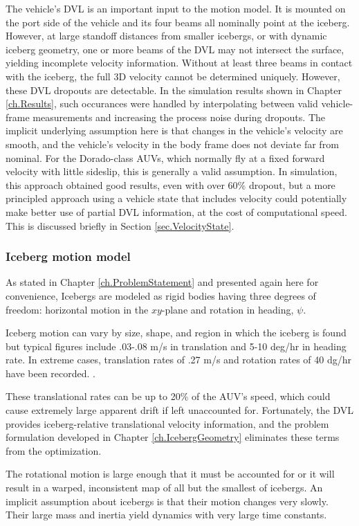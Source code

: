 The vehicle's DVL is an important input to the motion model. It is mounted on the port side of the vehicle and its four beams all nominally point at the iceberg. However, at large standoff distances from smaller icebergs, or with dynamic iceberg geometry, one or more beams of the DVL may not intersect the surface, yielding incomplete velocity information. Without at least three beams in contact with the iceberg, the full 3D velocity cannot be determined uniquely. However, these DVL dropouts are detectable. In the simulation results shown in Chapter \ref{ch.Results}, such occurances were handled by interpolating between valid vehicle-frame measurements and increasing the process noise during dropouts. The implicit underlying assumption here is that changes in the vehicle's velocity are smooth, and the vehicle's velocity in the body frame does not deviate far from nominal. For the Dorado-class AUVs, which normally fly at a fixed forward velocity with little sideslip, this is generally a valid assumption. In simulation, this approach obtained good results, even with over 60\% dropout, but a more principled approach using a vehicle state that includes velocity could potentially make better use of partial DVL information, at the cost of computational speed. This is discussed briefly in Section \ref{sec.VelocityState}.


\subsubsection{Iceberg motion model}

As stated in Chapter \ref{ch.ProblemStatement} and presented again here for convenience, Icebergs are modeled as rigid bodies having three degrees of freedom: horizontal motion in the $xy$-plane and rotation in heading, $\psi$. 

Iceberg motion can vary by size, shape, and region in which the iceberg is found but typical figures include .03-.08 m/s in translation  and 5-10 deg/hr in heading rate. In extreme cases, translation rates of .27 m/s and rotation rates of 40 dg/hr have been recorded. \cite{?} \cite{?}. 

These translational rates can be up to 20\% of the AUV's speed, which could cause extremely large apparent drift if left unaccounted for. Fortunately, the DVL provides iceberg-relative translational velocity information, and the problem formulation developed in Chapter \ref{ch.IcebergGeometry} eliminates these terms from the optimization.

The rotational motion is large enough that it must be accounted for or it will result in a warped, inconsistent map of all but the smallest of icebergs. An implicit assumption about icebergs is that their motion changes very slowly. Their large mass and inertia yield dynamics with very large time constants. 

